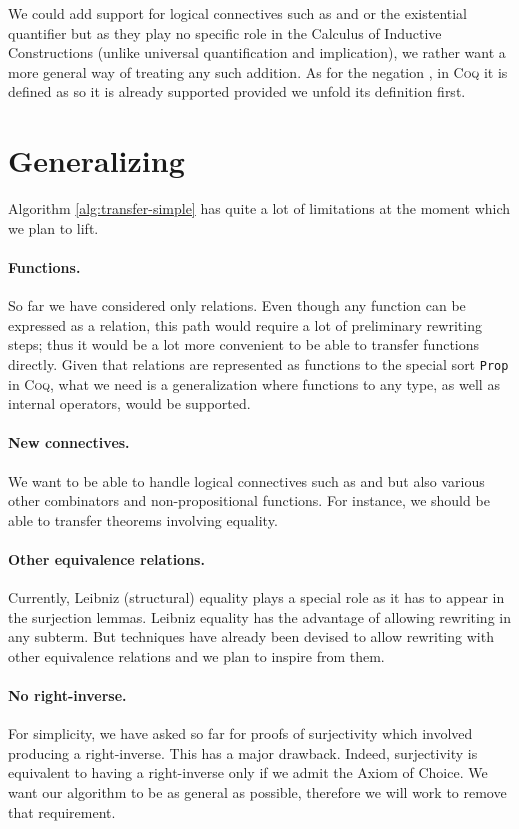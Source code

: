 \documentclass{llncs}
\begin{document}
We could add support for logical connectives
such as  and  or
the existential quantifier  but as they play
no specific role in the Calculus of Inductive Constructions
(unlike universal quantification and implication),
we rather want a more general way of treating any such addition.
As for the negation , in \textsc{Coq} it is defined as
 so it is already supported
provided we unfold its definition first.

\section{Generalizing}

Algorithm \ref{alg:transfer-simple} has quite a lot of limitations at the moment
which we plan to lift.

\paragraph{Functions.}
So far we have considered only relations. Even though any function can be expressed as a relation,
this path would require a lot of preliminary rewriting steps; thus
it would be a lot more convenient to be able to transfer functions directly.
Given that relations are represented as functions to the special sort \texttt{Prop} in \textsc{Coq},
what we need is a generalization where functions to any type, as well as
internal operators, would be supported.

\paragraph{New connectives.}
We want to be able to handle logical connectives such as  and  but also various
other combinators and non-propositional functions.
For instance, we should be able to transfer theorems involving equality.

\paragraph{Other equivalence relations.}
Currently, Leibniz (structural) equality plays a special role as it has to appear
in the surjection lemmas. Leibniz equality has the advantage of allowing rewriting in any
subterm. But techniques have already been devised \cite{Sozeau2010}
to allow rewriting with other equivalence
relations and we plan to inspire from them.

\paragraph{No right-inverse.}
For simplicity, we have asked so far
for proofs of surjectivity which involved
producing a right-inverse. This has a major drawback. Indeed,
surjectivity is equivalent to having a right-inverse only
if we admit the Axiom of Choice.
We want our algorithm to be as general as possible,
therefore we will work to remove that requirement.
\end{document}
